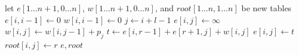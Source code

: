 \begin{algorithmic}
\State let $e[1\ldots n+1,0\ldots n]$, $w[1\ldots n+1,0\ldots n]$, and $\mathit{root}[1\ldots n,1\ldots n]$ be new tables
  \State $e[i,i-1] \gets 0$
  \State $w[i,i-1] \gets 0$
\EndFor
{}
    \State $j \gets i + l - 1$
    \State $e[i,j] \gets \infty$
    \State $w[i,j] \gets w[i,j-1] + p_j$
      \State $t \gets e[i,r-1] + e[r+1,j] + w[i,j]$
        \State $e[i,j] \gets t$
        \State $\mathit{root}[i,j] \gets r$
      \EndIf
    \EndFor
  \EndFor
\EndFor
\State \Return $e,\mathit{root}$
\EndFunction
\end{algorithmic}